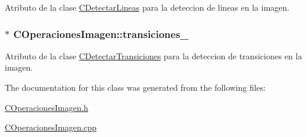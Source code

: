 Atributo de la clase \hyperlink{classCDetectarLineas}{C\+Detectar\+Lineas} para la deteccion de lineas en la imagen. 

\subsubsection[{\texorpdfstring{transiciones\+\_\+}{transiciones_}}]{$\ast$ C\+Operaciones\+Imagen\+::transiciones\+\_\+\hspace{0.3cm}{\ttfamily [private]}}\hypertarget{classCOperacionesImagen_a7ca38abb7714e00773895e8bcda443c1}{}\label{classCOperacionesImagen_a7ca38abb7714e00773895e8bcda443c1}


Atributo de la clase \hyperlink{classCDetectarTransiciones}{C\+Detectar\+Transiciones} para la deteccion de transiciones en la imagen. 



The documentation for this class was generated from the following files\+:\begin{DoxyCompactItemize}
\item 
\hyperlink{COperacionesImagen_8h}{C\+Operaciones\+Imagen.\+h}\item 
\hyperlink{COperacionesImagen_8cpp}{C\+Operaciones\+Imagen.\+cpp}\end{DoxyCompactItemize}
